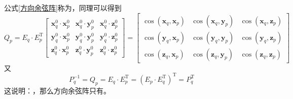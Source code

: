 公式\eqref{方向余弦阵}称为，同理可以得到
\begin{equation}
	Q_p = E_q \cdot E_p^{\text{T}}
	\begin{bmatrix}
		\bm{x}_q^0 \cdot \bm{x}_p^0 & \bm{x}_q^0 \cdot \bm{y}_p^0 & \bm{x}_q^0 \cdot \bm{z}_p^0 \\ 
		\bm{y}_q^0 \cdot \bm{x}_p^0 & \bm{y}_q^0 \cdot \bm{y}_p^0 & \bm{y}_q^0 \cdot \bm{z}_p^0 \\ 
		\bm{z}_q^0 \cdot \bm{x}_p^0 & \bm{z}_q^0 \cdot \bm{y}_p^0 & \bm{z}_q^0 \cdot \bm{z}_p^0 
	\end{bmatrix}
	=
	\begin{bmatrix}
		\cos(\bm{x}_q, \bm{x}_p) & \cos(\bm{x}_q, \bm{y}_p) & \cos(\bm{x}_q, \bm{z}_p)\\
		\cos(\bm{y}_q, \bm{x}_p) & \cos(\bm{y}_q, \bm{y}_p) & \cos(\bm{y}_q, \bm{z}_p)\\
		\cos(\bm{z}_q, \bm{x}_p) & \cos(\bm{z}_q, \bm{y}_p) & \cos(\bm{z}_q, \bm{z}_p)
	\end{bmatrix}
\end{equation}
又
\begin{equation*}
	P_q^{-1} = Q_p = E_q \cdot E_p^{\text{T}} = \left(E_p \cdot E_q^{\text{T}} \right)^{\text{T}} = P_q^{\text{T}}
\end{equation*}
这说明：\red[方向余弦阵是正交矩阵]，那么方向余弦阵只有\blue[三个独立变量]。


